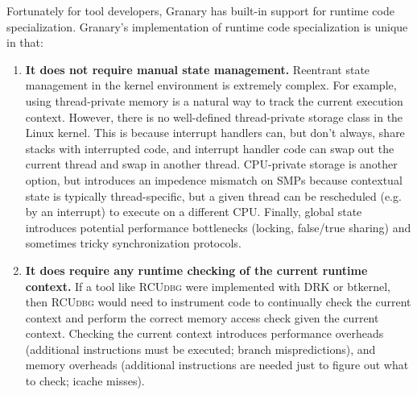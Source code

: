 \documentclass[preprint]{sigplanconf}
\newcommand{\toolname}[1]{{\scshape #1}}
\begin{document}

Fortunately for tool developers, Granary has built-in support for runtime code specialization. Granary's implementation of runtime code specialization is unique in that: \begin{enumerate}

	\item {\bf It does not require manual state management.} Reentrant state management in the kernel environment is extremely complex. For example, using thread-private memory is a natural way to track the current execution context. However, there is no well-defined thread-private storage class in the Linux kernel. This is because interrupt handlers can, but don't always, share stacks with interrupted code, and interrupt handler code can swap out the current thread and swap in another thread. CPU-private storage is another option, but introduces an impedence mismatch on SMPs because contextual state is typically thread-specific, but a given thread can be rescheduled (e.g. by an interrupt) to execute on a different CPU. Finally, global state introduces potential performance bottlenecks (locking, false/true sharing) and sometimes tricky synchronization protocols.

	\item {\bf It does require any runtime checking of the current runtime context.} If a tool like \toolname{RCUdbg} were implemented with DRK or btkernel, then \toolname{RCUdbg} would need to instrument code to continually check the current context and perform the correct memory access check given the current context. Checking the current context introduces performance overheads (additional instructions must be executed; branch mispredictions), and memory overheads (additional instructions are needed just to figure out what to check; icache misses).

\end{enumerate}
\end{document}
